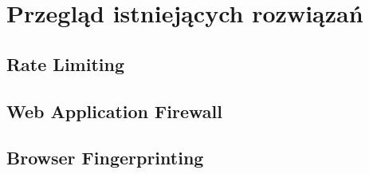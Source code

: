 \newpage

\section{Przegląd istniejących rozwiązań}\label{sec:przeglad-rozwiazan}

\subsection{Rate Limiting}\label{subsec:rate-limiting}


\subsection{Web Application Firewall}\label{subsec:waf}


\subsection{Browser Fingerprinting}\label{subsec:browser-fingerprinting}

